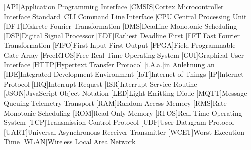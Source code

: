 \documentclass[../EDF Master Thesis.tex]{subfiles}
\begin{document}
    \begin{acronym}[abkuerzungen]
        [API]{Application Programming Interface}
        [CMSIS]{Cortex Microcontroller Interface Standard}
        [CLI]{Command Line Interface}
        [CPU]{Central Processing Unit}
        [DFT]{Diskrete Fourier Transformation}
        [DMS]{Deadline Monotonic Scheduling}
        [DSP]{Digital Signal Processor}
        [EDF]{Earliest Deadline First}
        [FFT]{Fast Fourier Transformation}
        [FIFO]{First Input First Output}
        [FPGA]{Field Programmable Gate Array}
        [FreeRTOS]{Free Real-Time Operating System}
        [GUI]{Graphical User Interface}
        [HTTP]{Hypertext Transfer Protocol}
        [i.A.a.]{in Anlehnung an}
        [IDE]{Integrated Development Environment}
        [IoT]{Internet of Things}
        [IP]{Internet Protocol}
        [IRQ]{Interrupt Request}
        [ISR]{Interrupt Service Routine}
        [JSON]{JavaScript Object Notation}
        [LED]{Light Emitting Diode}
        [MQTT]{Message Queuing Telemetry Transport}
        [RAM]{Random-Access Memory}
        [RMS]{Rate Monotonic Scheduling}
        [ROM]{Read-Only Memory}
        [RTOS]{Real-Time Operating System}
        [TCP]{Transmission Control Protocol}
        [UDP]{User Datagram Protocol}
        [UART]{Universal Asynchronous Receiver Transmitter}
        [WCET]{Worst Execution Time}
        [WLAN]{Wireless Local Area Network}
	\end{acronym}
\end{document}
